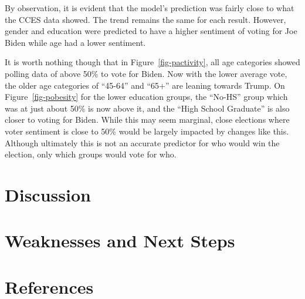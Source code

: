 \documentclass[
  letterpaper,
  DIV=11,
  numbers=noendperiod]{scrartcl}
\begin{document}
By observation, it is evident that the model's prediction was fairly
close to what the CCES data showed. The trend remains the same for each
result. However, gender and education were predicted to have a higher
sentiment of voting for Joe Biden while age had a lower sentiment.

It is worth nothing though that in Figure~\ref{fig-pactivity}, all age
categories showed polling data of above 50\% to vote for Biden. Now with
the lower average vote, the older age categories of ``45-64'' and
``65+'' are leaning towards Trump. On Figure~\ref{fig-pobesity} for the
lower education groups, the ``No-HS'' group which was at just about 50\%
is now above it, and the ``High School Graduate'' is also closer to
voting for Biden. While this may seem marginal, close elections where
voter sentiment is close to 50\% would be largely impacted by changes
like this. Although ultimately this is not an accurate predictor for who
would win the election, only which groups would vote for who.

\hypertarget{discussion}{%
\section{Discussion}\label{discussion}}

\hypertarget{weaknesses-and-next-steps}{%
\section{Weaknesses and Next Steps}\label{weaknesses-and-next-steps}}

\newpage

\hypertarget{references}{%
\section*{References}\label{references}}
\end{document}
